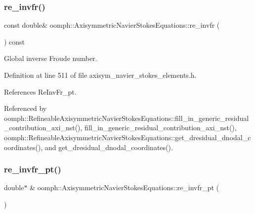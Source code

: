 \mbox{\label{classoomph_1_1AxisymmetricNavierStokesEquations_aab647203e95cec99d25d42cee76a5e38}} 
\subsubsection{\texorpdfstring{re\+\_\+invfr()}{re\_invfr()}}
{\footnotesize\ttfamily const double\& oomph\+::\+Axisymmetric\+Navier\+Stokes\+Equations\+::re\+\_\+invfr (\begin{DoxyParamCaption}{ }\end{DoxyParamCaption}) const\hspace{0.3cm}{\ttfamily [inline]}}



Global inverse Froude number. 



Definition at line 511 of file axisym\+\_\+navier\+\_\+stokes\+\_\+elements.\+h.



References Re\+Inv\+Fr\+\_\+pt.



Referenced by oomph\+::\+Refineable\+Axisymmetric\+Navier\+Stokes\+Equations\+::fill\+\_\+in\+\_\+generic\+\_\+residual\+\_\+contribution\+\_\+axi\+\_\+nst(), fill\+\_\+in\+\_\+generic\+\_\+residual\+\_\+contribution\+\_\+axi\+\_\+nst(), oomph\+::\+Refineable\+Axisymmetric\+Navier\+Stokes\+Equations\+::get\+\_\+dresidual\+\_\+dnodal\+\_\+coordinates(), and get\+\_\+dresidual\+\_\+dnodal\+\_\+coordinates().

\mbox{\label{classoomph_1_1AxisymmetricNavierStokesEquations_a2b2641a17d3406043cdf535fb6ede367}} 
\subsubsection{\texorpdfstring{re\+\_\+invfr\+\_\+pt()}{re\_invfr\_pt()}}
{\footnotesize\ttfamily double$\ast$ \& oomph\+::\+Axisymmetric\+Navier\+Stokes\+Equations\+::re\+\_\+invfr\+\_\+pt (\begin{DoxyParamCaption}{ }\end{DoxyParamCaption})\hspace{0.3cm}{\ttfamily [inline]}}



